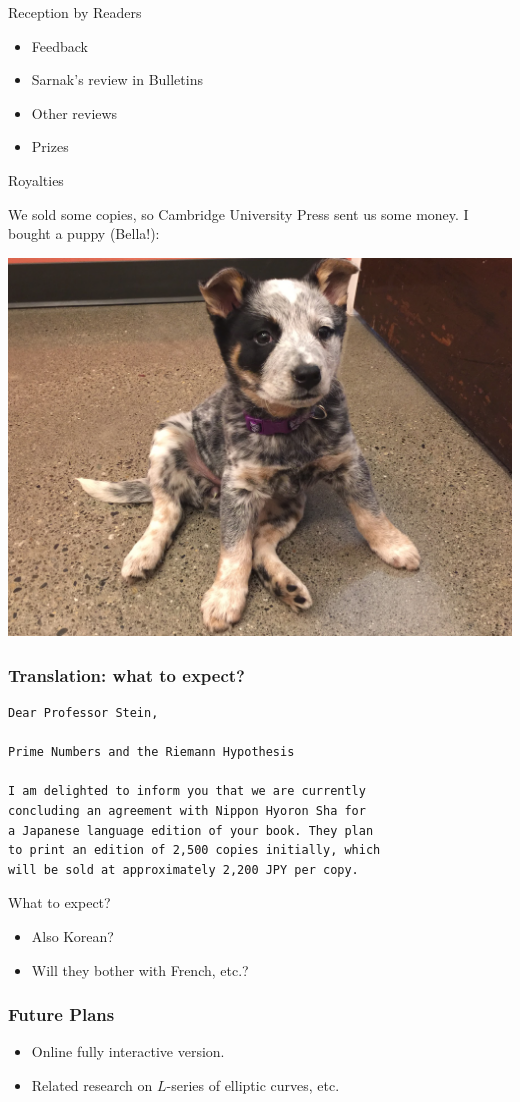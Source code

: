 \documentclass{beamer}
\begin{document}
\begin{frame}{Reception by Readers}
  \begin{itemize}
    \item Feedback
    \item Sarnak's review in Bulletins
    \item Other reviews
    \item Prizes
  \end{itemize}
\end{frame}

\begin{frame}{Royalties}

  We sold some copies, so Cambridge University Press sent us some money.
  I bought a puppy (Bella!):

  \begin{center}
    \includegraphics[height=.7\textheight]{pics/bella-puppy.png}
  \end{center}


\end{frame}


\begin{frame}[fragile]
  \frametitle{Translation: what to expect?}
  \begin{verbatim}
Dear Professor Stein,

Prime Numbers and the Riemann Hypothesis

I am delighted to inform you that we are currently
concluding an agreement with Nippon Hyoron Sha for
a Japanese language edition of your book. They plan
to print an edition of 2,500 copies initially, which
will be sold at approximately 2,200 JPY per copy.
  \end{verbatim}

  What to expect?
  \begin{itemize}
    \item  Also Korean?
    \item  Will they bother with French, etc.?
  \end{itemize}
\end{frame}


\begin{frame}
  \frametitle{Future Plans}
  \begin{itemize}
    \item Online fully interactive version.
    \item Related research on $L$-series of elliptic curves, etc.
  \end{itemize}
\end{frame}
\end{document}
